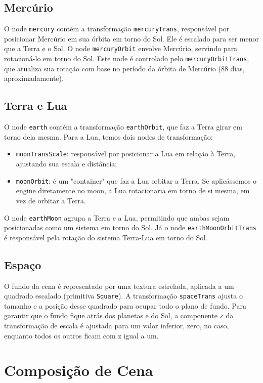 \documentclass[11pt, a4paper]{article}
\begin{document}
\subsection{Mercúrio}
O node \texttt{mercury} contém a transformação \texttt{mercuryTrans}, responsável 
por posicionar Mercúrio em sua órbita em torno do Sol. Ele é escalado para ser 
menor que a Terra e o Sol. O node \texttt{mercuryOrbit} envolve Mercúrio, 
servindo para rotacioná-lo em torno do Sol. Este node é controlado pelo
\texttt{mercuryOrbitTrans}, que atualiza sua rotação com base no período da 
órbita de Mercúrio (88 dias, aproximadamente).

\subsection{Terra e Lua}
O node \texttt{earth} contém a transformação \texttt{earthOrbit}, que faz a 
Terra girar em torno dela mesma. Para a Lua, temos dois nodes de transformação:

\begin{itemize}
\item \texttt{moonTransScale}: responsável por posicionar a Lua em relação à Terra, 
ajustando sua escala e distância;
\item \texttt{moonOrbit}: é um "container" que faz a Lua orbitar a Terra. Se
aplicássemos o engine diretamente no moon, a Lua rotacionaria em 
torno de si mesma, em vez de orbitar a Terra.
\end{itemize}

O node \texttt{earthMoon} agrupa a Terra e a Lua, permitindo que ambas sejam 
posicionadas como um sistema em torno do Sol. Já o node 
\texttt{earthMoonOrbitTrans} é responsável pela rotação do sistema Terra-Lua em 
torno do Sol.

\subsection{Espaço}
O fundo da cena é representado por uma textura estrelada, aplicada a um quadrado 
escalado (primitiva \texttt{Square}). A transformação \texttt{spaceTrans} ajusta 
o tamanho e a posição desse quadrado para ocupar todo o plano de fundo. Para 
garantir que o fundo fique atrás dos planetas e do Sol, a componente \texttt{z} 
da transformação de escala é ajustada para um valor inferior, zero, no caso,
enquanto todos os outros ficam com z igual a um.

\section {Composição de Cena}
\end{document}
